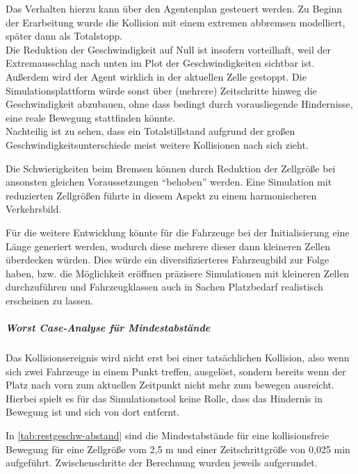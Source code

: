 Das Verhalten hierzu kann über den Agentenplan gesteuert werden.
Zu Beginn der Erarbeitung wurde die Kollision mit einem extremen abbremsen modelliert, später dann als Totalstopp.
\\
Die Reduktion der Geschwindigkeit auf Null ist insofern vorteilhaft, weil der Extremausschlag nach unten im Plot der Geschwindigkeiten sichtbar ist.
Außerdem wird der Agent wirklich in der aktuellen Zelle gestoppt. 
Die Simulationsplattform würde sonst über (mehrere) Zeitschritte hinweg die Geschwindigkeit abzubauen, ohne dass bedingt durch vorausliegende Hindernisse, eine reale Bewegung stattfinden könnte. 
\\
Nachteilig ist zu sehen, dass ein Totalstillstand aufgrund der großen Geschwindigkeitsunterschiede meist weitere Kollisionen nach sich zieht.

Die Schwierigkeiten beim Bremsen können durch Reduktion der Zellgröße bei ansonsten gleichen Voraussetzungen \enquote{behoben} werden.
Eine Simulation mit reduzierten Zellgrößen führte in diesem Aspekt zu einem harmonischeren Verkehrsbild.

Für die weitere Entwicklung könnte für die Fahrzeuge bei der Initialisierung eine Länge generiert werden, wodurch diese mehrere dieser dann kleineren Zellen überdecken würden.
Dies würde ein diversifizierteres Fahrzeugbild zur Folge haben, bzw. die Möglichkeit eröffnen präzisere Simulationen mit kleineren Zellen durchzuführen und Fahrzeugklassen auch in Sachen Platzbedarf realistisch erscheinen zu lassen.


\subparagraph*{Worst Case-Analyse für Mindestabstände}

Das Kollisionsereignis wird nicht erst bei einer tatsächlichen Kollision, also wenn sich zwei Fahrzeuge in einem Punkt treffen, ausgelöst, sondern bereits wenn der Platz nach vorn zum aktuellen Zeitpunkt nicht mehr zum bewegen ausreicht.
Hierbei spielt es für das Simulationstool keine Rolle, dass das Hindernis in Bewegung ist und sich von dort entfernt.

In \cref{tab:restgeschw-abstand} sind die Mindestabstände für eine kollisionsfreie Bewegung für eine Zellgröße vom 2,5 m und einer Zeitschrittgröße von 0,025 min aufgeführt.
Zwischenschritte der Berechnung wurden jeweils aufgerundet.

